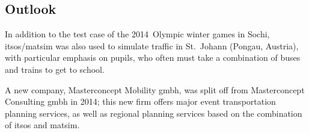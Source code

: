 \subsection{Outlook}
In addition to the test case of the 2014~Olympic winter games in Sochi, \gls{itsos}/\gls{matsim}
was also used to simulate traffic in St.\ Johann (Pongau, Austria), with particular 
emphasis on pupils, who often must take a combination of buses and trains to
get to school.

A new company, Masterconcept Mobility \gls{gmbh}, was split off from Masterconcept Consulting \gls{gmbh} in 2014; 
this new firm offers major event transportation planning services, as well as regional planning services 
based on the combination of \gls{itsos} and \gls{matsim}.

